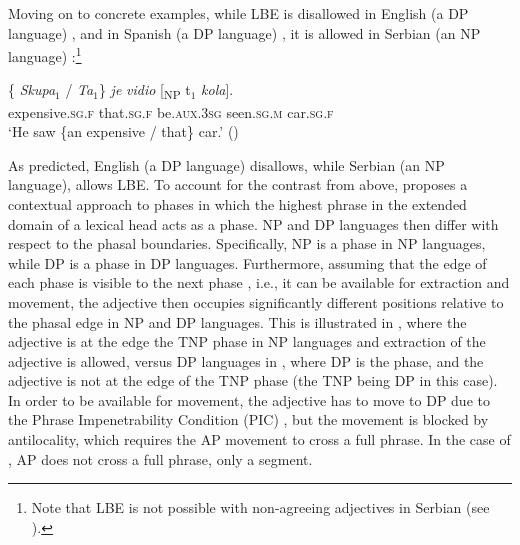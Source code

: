 \documentclass[output=paper,
hidelinks,
newtxmath,
]{langscibook}
\begin{document}
Moving on to concrete examples, while LBE is disallowed in English (a DP language) , and in Spanish (a DP language) , it is allowed in Serbian (an NP language) :\footnote{\label{fn3}Note that LBE is not possible with non-agreeing adjectives in Serbian (see \citealt{Boskovic2013}).}

    \label{ex2}
 \z


\ea \label{ex3}
	\z
\z

\ea \label{ex4}
\gll \{\hspace{-2pt} \textit{Skupa$_1$} / \textit{Ta$_1$}\} \textit{je} \textit{vidio} [\textsubscript{NP} t$_1$ \textit{kola}].\\
     {} expensive\textsc{.sg.f} {} that\textsc{.sg.f} be.\textsc{aux.3sg} seen.\textsc{sg.m} {} {} car.\textsc{sg.f}\\
\glt `He saw \{an expensive / that\} car.' \hfill (\citealt{Boskovic2008})
\z

\noindent As predicted, English (a DP language) disallows, while Serbian (an NP language), allows LBE. To account for the contrast from above, \citet{Boskovic2013,Boskovic2014} proposes a contextual approach to phases in which the highest phrase in the extended domain of a lexical head acts as a phase. NP and DP languages then differ with respect to the phasal boundaries. Specifically, NP is a phase in NP languages, while DP is a phase in DP languages. Furthermore, assuming that the edge of each phase is visible to the next phase \citep{Chomsky2001}, i.e., it can be available for extraction and movement, the adjective then occupies significantly different positions relative to the phasal edge in NP and DP languages. This is illustrated in , where the adjective is at the edge the TNP phase in NP languages  and extraction of the adjective is allowed, versus DP languages in , where DP is the phase, and the adjective is not at the edge of the TNP phase (the TNP being DP in this case). In order to be available for movement, the adjective has to move to DP due to the Phrase Impenetrability Condition (PIC) \citep{Chomsky2001}, but the movement is blocked by antilocality, which requires the AP movement to cross a full phrase. In the case of , AP does not cross a full phrase, only a segment.
\end{document}
